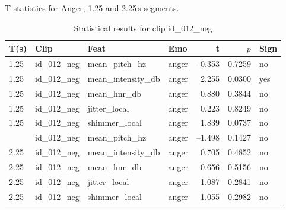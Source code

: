     \begin{table}
        
 
      \centering
      \caption{T-statistics for Anger, 1.25 and 2.25\,s segments.}
      \label{tab:ttest_anger_125_225s}
      \begin{tabular}{l l l l r r l}
        \toprule
        T(s) & Clip           & Feat            & Emo & t & $p$ & Sign \\
        \midrule
        1.25  & id\_012\_neg & mean\_pitch\_hz     & anger   & –0.353      & 0.7259    & no  \\
        1.25  & id\_012\_neg & mean\_intensity\_db & anger   &  2.255      & 0.0300    & yes \\
        1.25  & id\_012\_neg & mean\_hnr\_db       & anger   &  0.880      & 0.3844    & no  \\
        1.25  & id\_012\_neg & jitter\_local       & anger   &  0.223      & 0.8249    & no  \\
        1.25  & id\_012\_neg & shimmer\_local      & anger   &  1.839      & 0.0737    & no  \\
        \addlinespace
        2.25  & id\_012\_neg & mean\_pitch\_hz     & anger   & –1.498      & 0.1427    & no  \\
        2.25  & id\_012\_neg & mean\_intensity\_db & anger   &  0.705      & 0.4852    & no  \\
        2.25  & id\_012\_neg & mean\_hnr\_db       & anger   &  0.656      & 0.5156    & no  \\
        2.25  & id\_012\_neg & jitter\_local       & anger   &  1.087      & 0.2841    & no  \\
        2.25  & id\_012\_neg & shimmer\_local      & anger   &  1.055      & 0.2982    & no  \\
        \bottomrule
      \end{tabular}
    
    \caption{Statistical results for clip id\_012\_neg}
    \label{tab:clip012_stats}
  \end{table}

